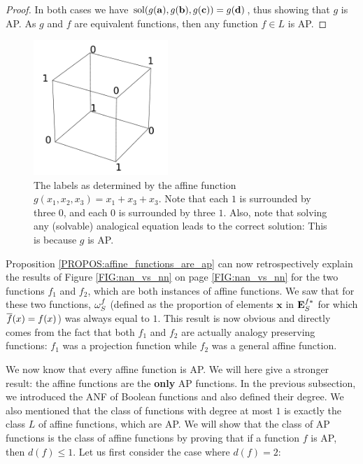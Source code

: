 \begin{proof}
  In both cases we have $\text{sol}(g(\mathbf{a}), g(\mathbf{b}), g(\mathbf{c})) =
  g(\mathbf{d})$, thus showing that $g$ is AP.
  As $g$ and $f$ are equivalent functions, then any function $f \in L$ is AP.
\end{proof}

\begin{figure}[!h]
\centering
  \includegraphics[width=2in]{figures/affine_functions_neighbors.pdf}
  \caption{The labels as determined by the affine function $g(x_1, x_2, x_3) =
  x_1 + x_3 + x_3$. Note that each $1$ is surrounded by three $0$, and each $0$
  is surrounded by three $1$. Also, note that solving any (solvable) analogical
  equation leads to the correct solution: This is because $g$ is AP.}
  \label{FIG:affine_functions_neighbors}
\end{figure}

Proposition \ref{PROPOS:affine_functions_are_ap} can now retrospectively
explain the results of Figure \ref{FIG:nan_vs_nn} on page \ref{FIG:nan_vs_nn}
for the two functions $f_1$ and $f_2$, which are both instances of affine
functions. We saw that for these two functions, $\omega_{S}^{f}$ (defined as the
proportion of elements $\mathbf{x}$ in $\mathbf{E}_{S}^{f*}$ for which $\overline{f}(x) = f(x)$) was
always equal to $1$. This result is now obvious and directly comes from the
fact that both $f_1$ and $f_2$ are actually analogy preserving functions: $f_1$
was a projection function while $f_2$ was a general affine function.

We now know that every affine function is AP. We will here give a stronger
result: the affine functions are the \textbf{only} AP functions.  In the
previous subsection, we introduced the ANF of Boolean functions and also
defined their degree. We also mentioned that the class of functions with degree
at most $1$ is exactly the class $L$ of affine functions, which are AP.  We
will show that the class of AP functions is the class of affine functions by
proving that if a function $f$ is AP, then $d(f)\leq 1$. Let us first consider
the case where $d(f) = 2$:

